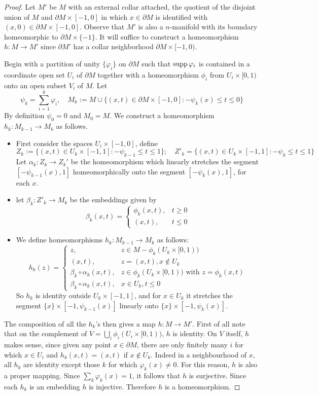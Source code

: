 \begin{proof}
Let $M'$ be $M$ with an external collar attached, the quotient of the disjoint union of $M$ and $\partial M\times[-1,0]$ in which $x\in\partial M$ is identified with $(x,0)\in\partial M\times[-1,0]$. Observe that $M'$ is also a $n$-manifold with its boundary homeomorphic to $\partial M\times\{-1\}$. It will suffice to construct a homeomorphism $h:M\to M'$ since $\partial M'$ has a collar neighborhood $\partial M\times[-1,0)$.\par
Begin with a partition of unity $\{\varphi_i\}$ on $\partial M$ such that $\mathrm{supp}\,\varphi_i$ is contained in a coordinate open set $U_i$ of $\partial M$ together with a homeomorphism $\phi_i $ from $U_i\times[0,1)$ onto an open subset $V_i$ of $M$. Let \[\psi_k=\sum_{i=1}^k\varphi_i,\quad M_k:=M\cup\{(x,t)\in\partial M\times[-1,0]:-\psi_k(x)\leq t\leq 0\}\]
By definition $\psi_0=0$ and $M_0=M$. We construct a homeomorphism $h_k:M_{k-1}\to M_k$ as follows.
\begin{itemize}
\item First consider the spaces $U_i\times[-1,0]$, define
\[Z_k:=\{(x,t)\in U_k\times[-1,1]:-\psi_{k-1}\leq t\leq1\};\quad Z'_k=\{(x,t)\in U_k\times[-1,1]:-\psi_{k}\leq t\leq 1\}\]
Let $\alpha_k:Z_k\to Z_k'$ be the homeomorphism which linearly stretches the segment $[-\psi_{k-1}(x),1]$ homeomorphically onto the segment $[-\psi_k(x),1]$, for each $x$.
\item let $\beta_k:Z'_k\to M_k$ be the embeddings given by
\[\beta_k(x,t)=\begin{cases}
\phi_k(x,t),&t\geq 0\\
(x,t),&t\leq 0
\end{cases}\]
\item We define homeomorphisms $h_k:M_{k-1}\to M_k$ as follows:
\[h_k(z)=\begin{cases}
z,&z\in M-\phi_k(U_k\times[0,1))\\
(x,t),&z=(x,t),x\notin U_k\\
\beta_k\circ\alpha_k(x,t),&z\in\phi_k(U_k\times[0,1))\text{ with }z=\phi_k(x,t)\\
\beta_k\circ\alpha_k(x,t),&x\in U_k, t\leq 0
\end{cases}\]
So $h_k$ is identity outside $U_k\times[-1,1]$, and for $x\in U_k$ it stretches the segment $\{x\}\times[-1,\psi_{k-1}(x)]$ linearly onto $\{x\}\times[-1,\psi_k(x)]$.
\end{itemize} 
The composition of all the $h_k$'s then gives a map $h:M\to M'$. First of all note that on the complement of $V=\bigcup_i\phi_i(U_i\times[0,1))$, $h$ is identity. On $V$ itself, $h$ makes sense, since given any point $x\in\partial M$, there are only finitely many $i$ for which $x\in U_i$ and $h_k(x,t)=(x,t)$ if $x\notin U_k$. Indeed in a neighbourhood of $x$, all $h_k$ are identity except those $k$ for which $\varphi_k(x)\neq 0$. For this reason, $h$ is also a proper mapping. Since $\sum_k\varphi_k(x)=1$, it follows that $h$ is surjective. Since each $h_k$ is an embedding $h$ is injective. Therefore $h$ is a homeomorphism.
\end{proof}
